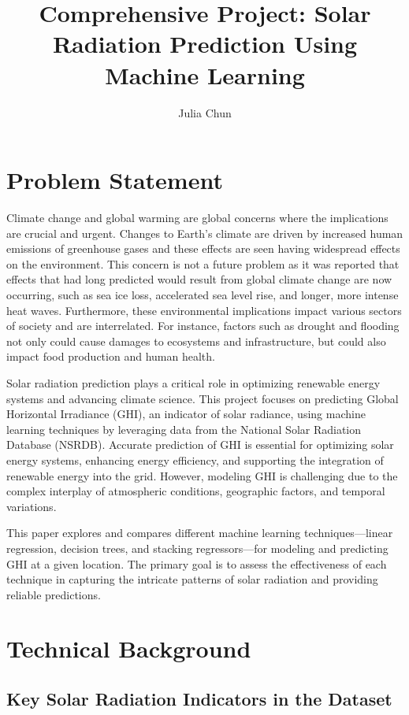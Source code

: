 \documentclass[10pt,twocolumn]{article}
\title{Comprehensive Project: {Solar Radiation Prediction Using Machine Learning}}
\author{Julia Chun}
\affiliation{Occidental College}
\begin{document}
\maketitle

\section{Problem Statement }
Climate change and global warming are global concerns where the implications are crucial and urgent. Changes to Earth's climate are driven by increased human emissions of greenhouse gases and these effects are seen having widespread effects on the environment. This concern is not a future problem as it was reported that effects that had long predicted would result from global climate change are now occurring, such as sea ice loss, accelerated sea level rise, and longer, more intense heat waves\cite{2}. Furthermore, these environmental implications impact various sectors of society and are interrelated. For instance, factors such as drought and flooding not only could cause damages to ecosystems and infrastructure, but could also impact food production and human health\cite{2}.

Solar radiation prediction plays a critical role in optimizing renewable energy systems and advancing climate science\cite{4}. This project focuses on predicting Global Horizontal Irradiance (GHI), an indicator of solar radiance, using machine learning techniques by leveraging data from the National Solar Radiation Database (NSRDB).  Accurate prediction of GHI is essential for optimizing solar energy systems, enhancing energy efficiency, and supporting the integration of renewable energy into the grid. However, modeling GHI is challenging due to the complex interplay of atmospheric conditions, geographic factors, and temporal variations.

This paper explores and compares different machine learning techniques—linear regression, decision trees, and stacking regressors—for modeling and predicting GHI at a given location. The primary goal is to assess the effectiveness of each technique in capturing the intricate patterns of solar radiation and providing reliable predictions.


\section{Technical Background}

\subsection{Key Solar Radiation Indicators in the Dataset}
\end{document}
